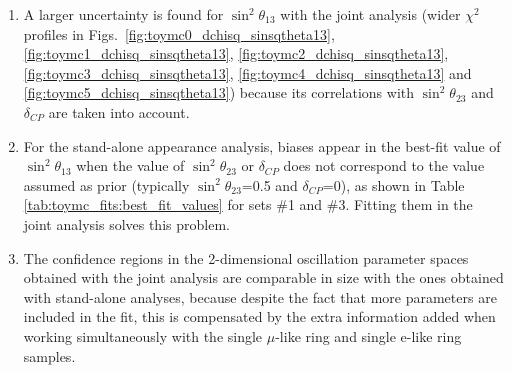 \begin{enumerate}
\item{A larger uncertainty is found for $\sin^{2}\theta_{13}$ with the joint analysis (wider $\chi^2$ profiles in 
    Figs.\ \ref{fig:toymc0_dchisq_sinsqtheta13}, 
    \ref{fig:toymc1_dchisq_sinsqtheta13},  
    \ref{fig:toymc2_dchisq_sinsqtheta13},  
    \ref{fig:toymc3_dchisq_sinsqtheta13},  
    \ref{fig:toymc4_dchisq_sinsqtheta13} and  
    \ref{fig:toymc5_dchisq_sinsqtheta13})   
    because its correlations with $\sin^{2}\theta_{23}$ and $\delta_{CP}$ are taken into account. }
\item{For the stand-alone appearance analysis, biases appear in the best-fit value of $\sin^{2}\theta_{13}$ when the value of $\sin^{2}\theta_{23}$ or $\delta_{CP}$ 
does not correspond to the value assumed as prior (typically $\sin^{2}\theta_{23}$=0.5 and $\delta_{CP}$=0), as shown in 
Table \ref{tab:toymc_fits:best_fit_values} for sets \#1 and \#3. 
Fitting them in the joint analysis solves this problem. }
\item{The confidence regions in the 2-dimensional oscillation parameter spaces obtained with the joint analysis are comparable in size with 
    the ones obtained with stand-alone analyses, because despite the fact that more parameters are included in the fit, this is compensated by the 
    extra information added when working simultaneously with 
    the single $\mu$-like ring and single e-like ring samples. }
\end{enumerate}


